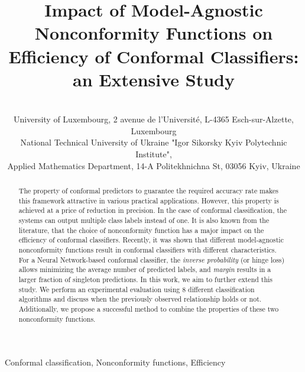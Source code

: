 \documentclass[tablecaption=bottom]{jmlr}%
\title[Impact of Nonconformity Functions on Efficiency of Conformal Classifiers]{
Impact of Model-Agnostic Nonconformity Functions on Efficiency of Conformal Classifiers: an Extensive Study
}
\author{\Name{Marharyta Aleksandrova} \Email{marharyta.aleksandrova@\{uni.lu,gmail.com\}}\\
  \addr University of Luxembourg, 2 avenue de l'Université, L-4365 Esch-sur-Alzette, Luxembourg
  \AND
  \Name{Oleg Chertov} \Email{chertov@i.ua}\\
  \addr National Technical University of Ukraine "Igor Sikorsky Kyiv Polytechnic Institute", \\
  Applied Mathematics Department, 14-A Politekhnichna St, 03056 Kyiv, Ukraine
 }
\begin{document}
\maketitle

\begin{abstract}
The property of conformal predictors to guarantee the required accuracy rate makes this framework attractive in various practical applications. However, this property is achieved at a price of reduction in precision. In the case of conformal classification, the systems can output multiple class labels instead of one. It is also known from the literature, that the choice of nonconformity function has a major impact on the efficiency of conformal classifiers. Recently, it was shown that different model-agnostic nonconformity functions result in conformal classifiers with different characteristics. For a Neural Network-based conformal classifier, the \textit{inverse probability} (or hinge loss) allows minimizing the average number of predicted labels, and \textit{margin} results in a larger fraction of singleton predictions. In this work, we aim to further extend this study. We perform an experimental evaluation using 8 different classification algorithms and discuss when the previously observed relationship holds or not. Additionally, we propose a successful method to combine the properties of these two nonconformity functions.
\end{abstract}
\begin{keywords}
Conformal classification,
Nonconformity functions,
Efficiency
\end{keywords}

%

















\appendix




\end{document}
